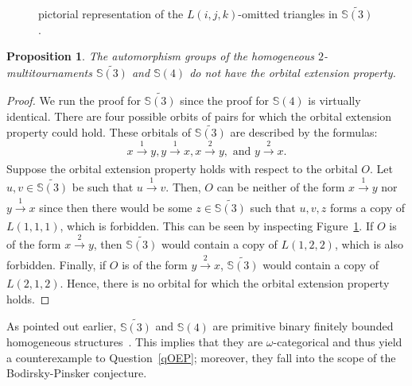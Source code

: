 \documentclass{article}
\newtheorem{prop}[theorem]{Proposition}
\theoremstyle{remark}
\theoremstyle{definition}
\begin{document}
\begin{figure}
\begin{center}
\begin{minipage}{0.3\textwidth}
\end{minipage}
    \end{center}
    \caption[]{pictorial representation of the $L(i,j,k)$-omitted triangles in $\widetilde{\mathbb{S}(3)}$.}
\label{S3}
\end{figure}

\begin{prop}\label{prop:noOEP} The automorphism groups of the homogeneous $2$-multitournaments  $\widetilde{\mathbb{S}(3)}$ and  $\mathbb{S}(4)$ do not have the orbital extension property.
\end{prop}
\begin{proof} We run the proof for $\widetilde{\mathbb{S}(3)}$ since the proof for $\mathbb{S}(4)$ is virtually identical. There are four possible orbits of pairs for which the orbital extension property could hold. These orbitals of $\widetilde{\mathbb{S}(3)}$ are described by the formulas:
\[x\xrightarrow[]{1}y, y\xrightarrow[]{1}x, x\xrightarrow[]{2}y, \text{ and } y\xrightarrow[]{2}x.\]
Suppose the orbital extension property holds with respect to the orbital $O$. Let $u,v\in \widetilde{\mathbb{S}(3)}$ be such that $u\xrightarrow[]{1}v$. Then, $O$ can be neither of the form $x\xrightarrow[]{1}y$ nor $y\xrightarrow[]{1}x$ since then there would be some $z\in \widetilde{\mathbb{S}(3)}$ such that $u,v,z$ forms a copy of $L(1,1,1)$, which is forbidden. This can be seen by inspecting Figure~\ref{S3}. If $O$ is of the form $x\xrightarrow[]{2}y$, then $\widetilde{\mathbb{S}(3)}$ would contain a copy of $L(1,2,2)$, which is also forbidden. Finally, if $O$ is of the form $y\xrightarrow[]{2}x$, $\widetilde{\mathbb{S}(3)}$ would contain a copy of $L(2, 1, 2)$. Hence, there is no orbital for which the orbital extension property holds.
\end{proof}
As pointed out earlier, $\widetilde{\mathbb{S}(3)}$ and  $\mathbb{S}(4)$ are primitive binary finitely bounded homogeneous structures~\cite{Cherlinclass}. This implies that they are $\omega$-categorical and thus yield a counterexample to Question~\ref{qOEP}; moreover, they fall into the scope of the Bodirsky-Pinsker conjecture.
   
\end{document}
